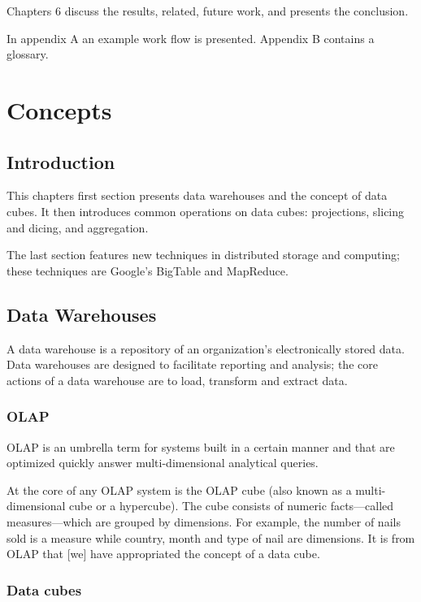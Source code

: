Chapters 6 discuss the results, related, future work, and presents the
conclusion.

In appendix A an example work flow is presented. Appendix B contains a glossary.


\chapter{Concepts}



\section*{Introduction}

This chapters first section presents data warehouses and the concept of data
cubes. It then introduces common operations on data cubes: projections, slicing
and dicing, and aggregation.

The last section features new techniques in distributed storage and computing;
these techniques are Google's BigTable and MapReduce.


\section{Data Warehouses}

A data warehouse is a repository of an organization's electronically stored
data. Data warehouses are designed to facilitate reporting and analysis; the
core actions of a data warehouse are to load, transform and extract data.


\subsection*{OLAP}

OLAP is an umbrella term for systems built in a certain manner and that are
optimized quickly answer multi-dimensional analytical queries.

At the core of any OLAP system is the OLAP cube (also known as a
multi-dimensional cube or a hypercube). The cube consists of numeric
facts---called measures---which are grouped by dimensions. For example, the
number of nails sold is a measure while country, month and type of nail are
dimensions. It is from OLAP that [we] have appropriated the concept of a data
cube.


\subsection*{Data cubes}

